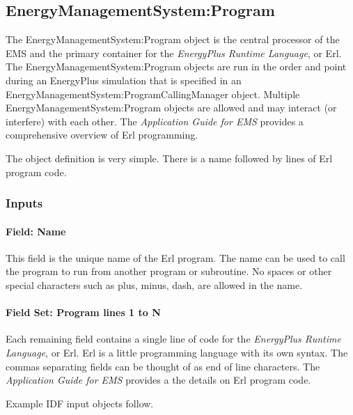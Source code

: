 \subsection{EnergyManagementSystem:Program}\label{energymanagementsystemprogram}

The EnergyManagementSystem:Program object is the central processor of the EMS and the primary container for the \emph{EnergyPlus Runtime Language}, or Erl. The EnergyManagementSystem:Program objects are run in the order and point during an EnergyPlus simulation that is specified in an EnergyManagementSystem:ProgramCallingManager object. Multiple EnergyManagementSystem:Program objects are allowed and may interact (or interfere) with each other. The \emph{Application Guide for EMS} provides a comprehensive overview of Erl programming.

The object definition is very simple. There is a name followed by lines of Erl program code.

\subsubsection{Inputs}\label{inputs-3-011}

\paragraph{Field: Name}\label{field-name-3-010}

This field is the unique name of the Erl program. The name can be used to call the program to run from another program or subroutine. No spaces or other special characters such as plus, minus, dash, are allowed in the name.

\paragraph{Field Set: Program lines 1 to N}\label{field-set-program-lines-1-to-n}

Each remaining field contains a single line of code for the \emph{EnergyPlus Runtime Language}, or Erl. Erl is a little programming language with its own syntax. The commas separating fields can be thought of as end of line characters. The \emph{Application Guide for EMS} provides a the details on Erl program code.

Example IDF input objects follow.

